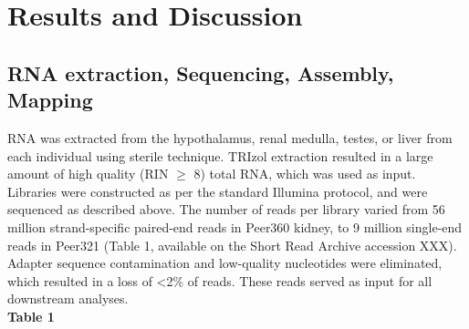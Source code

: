 \documentclass[11pt]{article}
\begin{document}
\section*{Results and Discussion}

\subsection*{RNA extraction, Sequencing, Assembly, Mapping}

RNA was extracted from the hypothalamus, renal medulla, testes, or liver from each individual using sterile technique. TRIzol extraction resulted in a large amount of high quality (RIN $\geq$ 8) total RNA, which was used as input. Libraries were constructed as per the standard Illumina protocol, and were sequenced as described above. The number of reads per library varied from 56 million strand-specific paired-end reads in Peer360 kidney, to 9 million single-end reads in Peer321 (\hypertarget{Table 1}{Table 1}, available on the Short Read Archive accession XXX). Adapter sequence contamination and low-quality nucleotides were eliminated, which resulted in a loss of \textless 2\% of reads. These reads served as input for all downstream analyses. \\
\textbf{\hypertarget{Table 1}{Table 1}} \\
\end{document}
